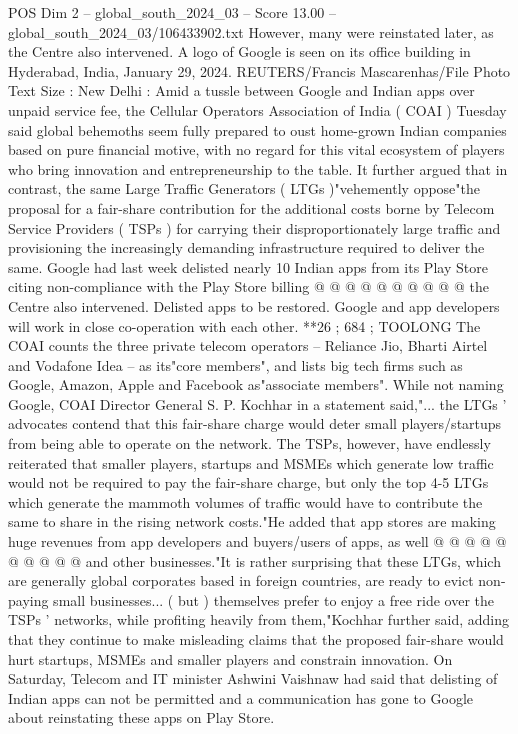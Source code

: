 \begin{textsample}{POS Dim 2 – global\_south\_2024\_03 – Score 13.00 – global\_south\_2024\_03/106433902.txt}
However, many were reinstated later, as the Centre also intervened.
A logo of Google is seen on its office building in Hyderabad, India, January 29, 2024.
REUTERS/Francis Mascarenhas/File Photo Text Size : New Delhi : Amid a tussle between Google and Indian apps over unpaid service fee, the Cellular Operators Association of India ( COAI ) Tuesday said global behemoths seem fully prepared to oust home-grown Indian companies based on pure financial motive, with no regard for this vital ecosystem of players who bring innovation and entrepreneurship to the table.
It further argued that in contrast, the same Large Traffic Generators ( LTGs )"vehemently oppose"the proposal for a fair-share contribution for the additional costs borne by Telecom Service Providers ( TSPs ) for carrying their disproportionately large traffic and provisioning the increasingly demanding infrastructure required to deliver the same.
Google had last week delisted nearly 10 Indian apps from its Play Store citing non-compliance with the Play Store billing @ @ @ @ @ @ @ @ @ @ the Centre also intervened.
Delisted apps to be restored.
Google and app developers will work in close co-operation with each other. **26 ; 684 ; TOOLONG The COAI counts the three private telecom operators -- Reliance Jio, Bharti Airtel and Vodafone Idea -- as its"core members", and lists big tech firms such as Google, Amazon, Apple and Facebook as"associate members".
While not naming Google, COAI Director General S.
P.
Kochhar in a statement said,"... the LTGs ' advocates contend that this fair-share charge would deter small players/startups from being able to operate on the network.
The TSPs, however, have endlessly reiterated that smaller players, startups and MSMEs which generate low traffic would not be required to pay the fair-share charge, but only the top 4-5 LTGs which generate the mammoth volumes of traffic would have to contribute the same to share in the rising network costs."He added that app stores are making huge revenues from app developers and buyers/users of apps, as well @ @ @ @ @ @ @ @ @ @ and other businesses."It is rather surprising that these LTGs, which are generally global corporates based in foreign countries, are ready to evict non-paying small businesses... ( but ) themselves prefer to enjoy a free ride over the TSPs ' networks, while profiting heavily from them,"Kochhar further said, adding that they continue to make misleading claims that the proposed fair-share would hurt startups, MSMEs and smaller players and constrain innovation.
On Saturday, Telecom and IT minister Ashwini Vaishnaw had said that delisting of Indian apps can not be permitted and a communication has gone to Google about reinstating these apps on Play Store.

\end{textsample}
